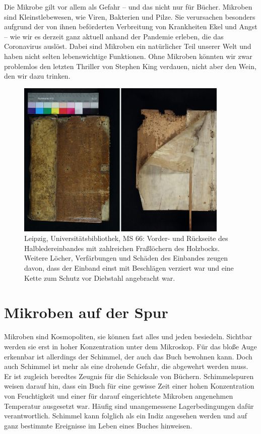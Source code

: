 \documentclass[a4paper,
fontsize=11pt,
oneside,
numbers=noperiodatend,
parskip=half-,
bibliography=totoc,
final
]{scrartcl}
\begin{document}
Die Mikrobe gilt vor allem als Gefahr -- und das nicht nur für Bücher.
Mikroben sind Kleinstlebewesen, wie Viren, Bakterien und Pilze. Sie
verursachen besonders aufgrund der von ihnen beförderten Verbreitung von
Krankheiten Ekel und Angst -- wie wir es derzeit ganz aktuell anhand der
Pandemie erleben, die das Coronavirus auslöst. Dabei sind Mikroben ein
natürlicher Teil unserer Welt und haben nicht selten lebenswichtige
Funktionen. Ohne Mikroben könnten wir zwar problemlos den letzten
Thriller von Stephen King verdauen, nicht aber den Wein, den wir dazu
trinken.

\begin{figure}
\centering
\includegraphics[width=0.9\textwidth]{img/image12.png} 
\caption{ Leipzig,
Universitätsbibliothek, MS 66: Vorder- und Rückseite des
Halbledereinbandes mit zahlreichen Fraßlöchern des Holzbocks. Weitere
Löcher, Verfärbungen und Schäden des Einbandes zeugen davon, dass der
Einband einst mit Beschlägen verziert war und eine Kette zum Schutz vor
Diebstahl angebracht war.}
\end{figure}

\hypertarget{mikroben-auf-der-spur}{%
\section{Mikroben auf der Spur}\label{mikroben-auf-der-spur}}

Mikroben sind Kosmopoliten, sie können fast alles und jeden besiedeln.
Sichtbar werden sie erst in hoher Konzentration unter dem Mikroskop. Für
das bloße Auge erkennbar ist allerdings der Schimmel, der auch das Buch
bewohnen kann. Doch auch Schimmel ist mehr als eine drohende Gefahr, die
abgewehrt werden muss. Er ist zugleich beredtes Zeugnis für die
Schicksale von Büchern. Schimmelspuren weisen darauf hin, dass ein Buch
für eine gewisse Zeit einer hohen Konzentration von Feuchtigkeit und
einer für darauf eingerichtete Mikroben angenehmen Temperatur ausgesetzt
war. Häufig sind unangemessene Lagerbedingungen dafür verantwortlich.
Schimmel kann folglich als ein Indiz angesehen werden und auf ganz
bestimmte Ereignisse im Leben eines Buches hinweisen.
\end{document}
